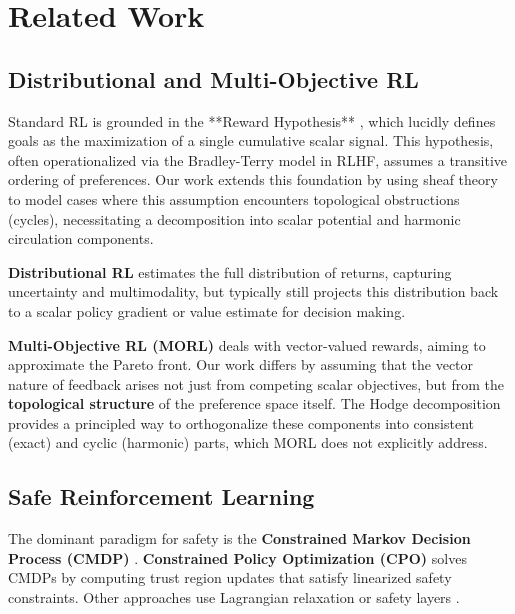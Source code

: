 \section{Related Work}
\label{sec:related}

\subsection{Distributional and Multi-Objective RL}

Standard RL is grounded in the **Reward Hypothesis** \citep{sutton2018reinforcement}, which lucidly defines goals as the maximization of a single cumulative scalar signal. This hypothesis, often operationalized via the Bradley-Terry model \citep{bradley1952rank} in RLHF, assumes a transitive ordering of preferences. Our work extends this foundation by using sheaf theory to model cases where this assumption encounters topological obstructions (cycles), necessitating a decomposition into scalar potential and harmonic circulation components.

\textbf{Distributional RL} \citep{bellemare2017distributional, dabney2018distributional} estimates the full distribution of returns, capturing uncertainty and multimodality, but typically still projects this distribution back to a scalar policy gradient or value estimate for decision making.

\textbf{Multi-Objective RL (MORL)} \citep{roijers2013survey} deals with vector-valued rewards, aiming to approximate the Pareto front. Our work differs by assuming that the vector nature of feedback arises not just from competing scalar objectives, but from the \textbf{topological structure} of the preference space itself. The Hodge decomposition provides a principled way to orthogonalize these components into consistent (exact) and cyclic (harmonic) parts, which MORL does not explicitly address.

\subsection{Safe Reinforcement Learning}

The dominant paradigm for safety is the \textbf{Constrained Markov Decision Process (CMDP)} \citep{altman1999constrained}. \textbf{Constrained Policy Optimization (CPO)} \citep{achiam2017constrained} solves CMDPs by computing trust region updates that satisfy linearized safety constraints. Other approaches use Lagrangian relaxation \citep{ray2019benchmarking} or safety layers \citep{dalal2018safe}.

